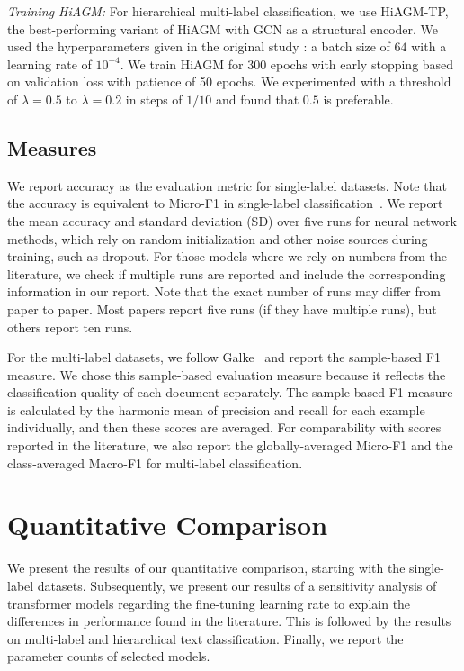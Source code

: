 \textit{Training HiAGM:}
For hierarchical multi-label classification, we use HiAGM-TP, the best-performing variant of HiAGM with GCN as a structural encoder. 
We used the hyperparameters given in the original study \cite{hiagm}: a batch size of $64$ with a learning rate of $10^{-4}$. 
We train HiAGM for 300 epochs with early stopping based on validation loss with patience of 50 epochs.
We experimented with a threshold of $\lambda=0.5$ to $\lambda=0.2$ in steps of $1/10$ and found that $0.5$ is preferable.

\subsection{Measures}
We report accuracy as the evaluation metric for single-label datasets.
Note that the accuracy is equivalent to Micro-F1 in single-label classification~\cite{galkescherp-acl2022}.
We report the mean accuracy and standard deviation (SD) over five runs for neural network methods, which rely on random initialization and other noise sources during training, such as dropout. 
For those models where we rely on numbers from the literature, we check if multiple runs are reported and include the corresponding information in our report. 
Note that the exact number of runs may differ from paper to paper. Most papers report five runs (if they have multiple runs), but others report ten runs.

For the multi-label datasets, we follow Galke~\etal\cite{DBLP:conf/kcap/GalkeMSBS17} and report the sample-based F1 measure. 
We chose this sample-based evaluation measure because it reflects the classification quality of each document separately. 
The sample-based F1 measure is calculated by the harmonic mean of precision and recall for each example individually, and then these scores are averaged.
For comparability with scores reported in the literature, we also report the globally-averaged Micro-F1 and the class-averaged Macro-F1 for multi-label classification.

\section{Quantitative Comparison}\label{sec:results}

We present the results of our quantitative comparison, starting with the single-label datasets.
Subsequently, we present our results of a sensitivity analysis of transformer models regarding the fine-tuning learning rate to explain the differences in performance found in the literature.
This is followed by the results on multi-label and hierarchical text classification. Finally, we report the parameter counts of selected models.

